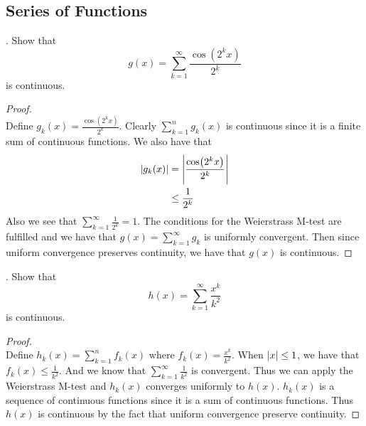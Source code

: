 \documentclass[a4paper]{article}
\begin{document}
\subsection{Series of Functions}
\begin{qtn}{}{}
\thetcbcounter.\;\; Show that $$g(x)=\sum_{k=1}^\infty\frac{\cos(2^kx)}{2^k}$$ is continuous. \\\hspace*{\fill}\cite{R0002}\tcbline
\begin{proof}~\\
Define $g_k(x)=\frac{\cos(2^kx)}{2^k}$. Clearly $\sum_{k=1}^ng_k(x)$ is continuous since it is a finite sum of continuous functions. We also have that 
\begin{align*}
\abs{g_k(x)}&=\abs{\frac{\cos(2^kx)}{2^k}}\\
&\leq\frac{1}{2^k}
\end{align*}
Also we see that $\sum_{k=1}^\infty\frac{1}{2^k}=1$. The conditions for the Weierstrass M-test are fulfilled and we have that $g(x)=\sum_{k=1}^\infty g_k$ is uniformly convergent. Then since uniform convergence preserves continuity, we have that $g(x)$ is continuous. 
\end{proof}
\end{qtn}

\begin{qtn}{}{}
\thetcbcounter.\;\; Show that $$h(x)=\sum_{k=1}^\infty\frac{x^k}{k^2}$$ is continuous. \\\hspace*{\fill}\cite{R0002}\tcbline
\begin{proof}~\\
Define $h_k(x)=\sum_{k=1}^nf_k(x)$ where $f_k(x)=\frac{x^k}{k^2}$. When $\abs{x}\leq 1$, we have that $f_k(x)\leq\frac{1}{k^2}$. And we know that $\sum_{k=1}^\infty\frac{1}{k^2}$ is convergent. Thus we can apply the Weierstrass M-test and $h_k(x)$ converges uniformly to $h(x)$. $h_k(x)$ is a sequence of continuous functions since it is a sum of continuous functions. Thus $h(x)$ is continuous by the fact that uniform convergence preserve continuity. 
\end{proof}
\end{qtn}
\end{document}
